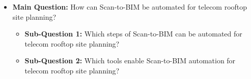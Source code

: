     \begin{itemize}
        \item \textbf{Main Question:} How can Scan-to-BIM be automated for telecom rooftop site planning?
        \begin{itemize}
            \item \textbf{Sub-Question 1:} Which steps of Scan-to-BIM can be automated for telecom rooftop site planning?
            \item \textbf{Sub-Question 2:} Which tools enable Scan-to-BIM automation for telecom rooftop site planning?
        \end{itemize}
    \end{itemize}